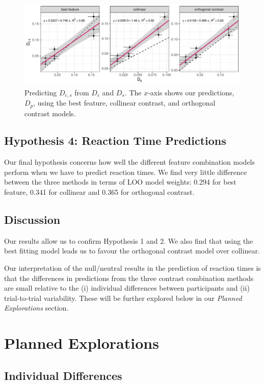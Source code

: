 \documentclass[preprint,12pt,authoryear]{elsarticle}
\begin{document}
\begin{figure}[ht]
\centering
\includegraphics[width=\textwidth]{../plots/Dpe.pdf}
\caption{Predicting $D_{c,s}$ from $D_c$ and $D_s$. The $x$-axis shows our predictions, $D_p$, using the best feature, collinear contrast, and orthogonal contrast models.}
\label{fig:new:Dpe}
\end{figure}

\subsection{Hypothesis 4: Reaction Time Predictions}

Our final hypothesis concerns how well the different feature combination models perform when we have to predict reaction times. We find very little difference between the three methods in terms of LOO model weights: 0.294 for best feature, 0.341 for collinear and 0.365 for orthogonal contrast. 

\subsection{Discussion}

Our results allow us to confirm Hypothesis 1 and 2. We also find that using the best fitting model leads us to favour the orthogonal contrast model over collinear. 

Our interpretation of the null/neutral results in the prediction of reaction times is that the differences in predictions from the three contrast combination methods are small relative to the (i) individual differences between participants and (ii) trial-to-trial variability. These will be further explored below in our \textit{Planned Explorations} section.

\section{Planned Explorations}

\subsection{Individual Differences}
\end{document}
